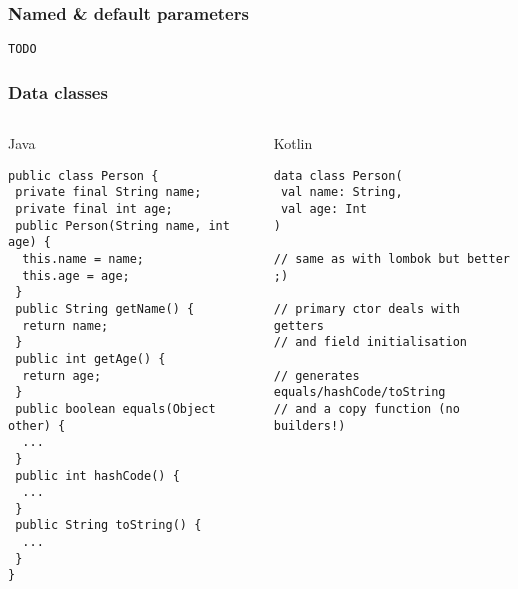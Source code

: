 \begin{frame}[fragile] \frametitle{Named \& default parameters}
\begin{lstlisting}
TODO
\end{lstlisting}
\end{frame}



\begin{frame}[fragile]
\frametitle{Data classes}
\begin{columns}[t]
\begin{column}{0.5\textwidth}
\begin{center}
  Java
\end{center}
\begin{lstlisting}[style=twosided]
public class Person {
 private final String name;
 private final int age;
 public Person(String name, int age) {
  this.name = name;
  this.age = age;
 }
 public String getName() {
  return name;
 }
 public int getAge() {
  return age;
 }
 public boolean equals(Object other) {
  ...
 }
 public int hashCode() {
  ...
 }
 public String toString() {
  ...
 }
}
\end{lstlisting}

\end{column}
\begin{column}{0.5\textwidth}
\begin{center}
  Kotlin
\end{center}
\begin{lstlisting}[style=twosided]
data class Person(
 val name: String,
 val age: Int
)

// same as with lombok but better ;)

// primary ctor deals with getters
// and field initialisation

// generates equals/hashCode/toString
// and a copy function (no builders!)
\end{lstlisting}
\end{column}
\end{columns}
\end{frame}





